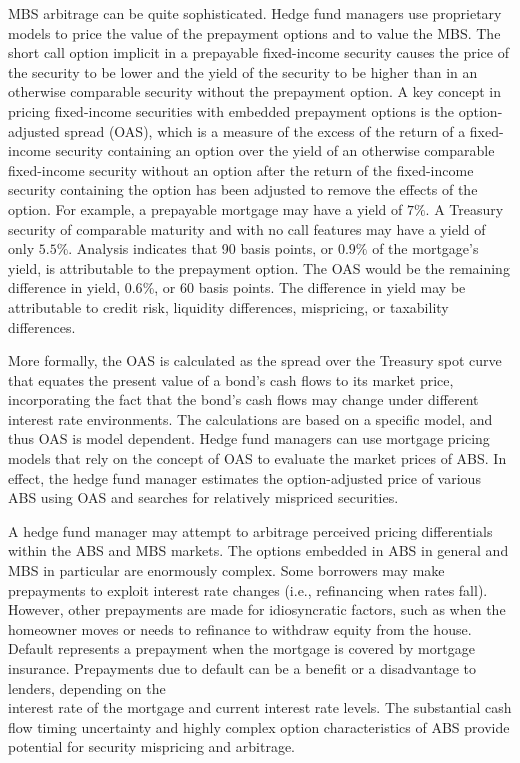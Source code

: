 \documentclass[11pt]{article}
\begin{document}
MBS arbitrage can be quite sophisticated. Hedge fund managers use proprietary models to price the value of the prepayment options and to value the MBS. The short call option implicit in a prepayable fixed-income security causes the price of the security to be lower and the yield of the security to be higher than in an otherwise comparable security without the prepayment option. A key concept in pricing fixed-income securities with embedded prepayment options is the option-adjusted spread (OAS), which is a measure of the excess of the return of a fixed-income security containing an option over the yield of an otherwise comparable fixed-income security without an option after the return of the fixed-income security containing the option has been adjusted to remove the effects of the option. For example, a prepayable mortgage may have a yield of $7 \%$. A Treasury security of comparable maturity and with no call features may have a yield of only $5.5 \%$. Analysis indicates that 90 basis points, or $0.9 \%$ of the mortgage's yield, is attributable to the prepayment option. The OAS would be the remaining difference in yield, $0.6 \%$, or 60 basis points. The difference in yield may be attributable to credit risk, liquidity differences, mispricing, or taxability differences.

More formally, the OAS is calculated as the spread over the Treasury spot curve that equates the present value of a bond's cash flows to its market price, incorporating the fact that the bond's cash flows may change under different interest rate environments. The calculations are based on a specific model, and thus OAS is model dependent. Hedge fund managers can use mortgage pricing models that rely on the concept of OAS to evaluate the market prices of ABS. In effect, the hedge fund manager estimates the option-adjusted price of various ABS using OAS and searches for relatively mispriced securities.

A hedge fund manager may attempt to arbitrage perceived pricing differentials within the ABS and MBS markets. The options embedded in ABS in general and MBS in particular are enormously complex. Some borrowers may make prepayments to exploit interest rate changes (i.e., refinancing when rates fall). However, other prepayments are made for idiosyncratic factors, such as when the homeowner moves or needs to refinance to withdraw equity from the house. Default represents a prepayment when the mortgage is covered by mortgage insurance. Prepayments due to default can be a benefit or a disadvantage to lenders, depending on the\\
interest rate of the mortgage and current interest rate levels. The substantial cash flow timing uncertainty and highly complex option characteristics of ABS provide potential for security mispricing and arbitrage.
\end{document}
